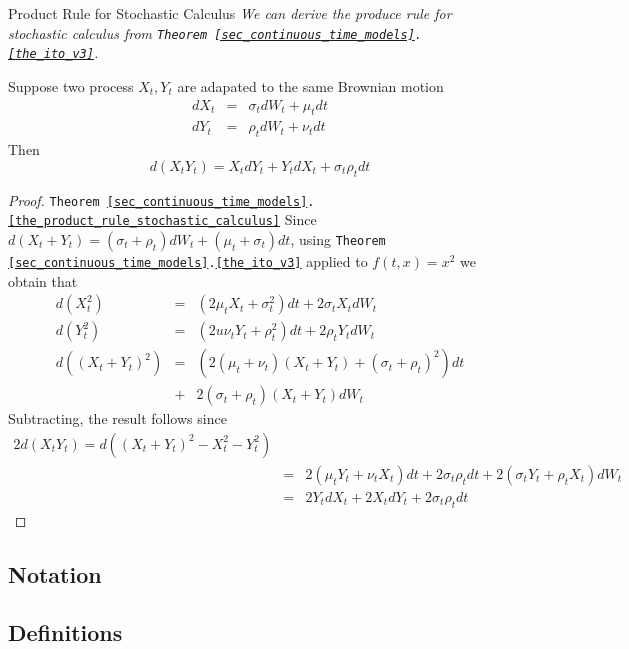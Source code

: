 \documentclass[11pt,a4paper]{article}
\begin{document}
  \begin{theorem}{Product Rule for Stochastic Calculus}\label{the_product_rule_stochastic_calculus}
    \textit{We can derive the produce rule for stochastic calculus from \texttt{Theorem \ref{sec_continuous_time_models}.\ref{the_ito_v3}}.}
    \par Suppose two process $X_t,Y_t$ are adapated to the same Brownian motion
    \[\begin{array}{rcl}
      dX_t&=&\sigma_tdW_t+\mu_tdt\\
      dY_t&=&\rho_tdW_t+\nu_tdt
    \end{array}\]
    Then
    \[ d(X_tY_t)=X_tdY_t+Y_tdX_t+\sigma_t\rho_tdt \]
  \end{theorem}

  \begin{proof}{\texttt{Theorem \ref{sec_continuous_time_models}.\ref{the_product_rule_stochastic_calculus}}}
    Since $d(X_t+Y_t)=(\sigma_t+\rho_t)dW_t+(\mu_t+\sigma_t)dt$, using \texttt{Theorem \ref{sec_continuous_time_models}.\ref{the_ito_v3}} applied to $f(t,x)=x^2$ we obtain that
    \[\begin{array}{rcl}
      d(X_t^2)&=&(2\mu_tX_t+\sigma_t^2)dt+2\sigma_tX_tdW_t\\
      d(Y_t^2)&=&(2u\nu_tY_t+\rho_t^2)dt+2\rho_tY_tdW_t\\
      d((X_t+Y_t)^2)&=&(2(\mu_t+\nu_t)(X_t+Y_t)+(\sigma_t+\rho_t)^2)dt\\
      &+&2(\sigma_t+\rho_t)(X_t+Y_t)dW_t
    \end{array}\]
    Subtracting, the result follows since
    \[\begin{array}{rcl}
      2d(X_tY_t)=d((X_t+Y_t)^2-X_t^2-Y_t^2)\\
      &=&2(\mu_tY_t+\nu_tX_t)dt+2\sigma_t\rho_tdt+2(\sigma_tY_t+\rho_tX_t)dW_t\\
      &=&2Y_tdX_t+2X_tdY_t+2\sigma_t\rho_tdt
    \end{array}\]
    \proved
  \end{proof}


\subsection{Notation}

\subsection{Definitions}
\end{document}
